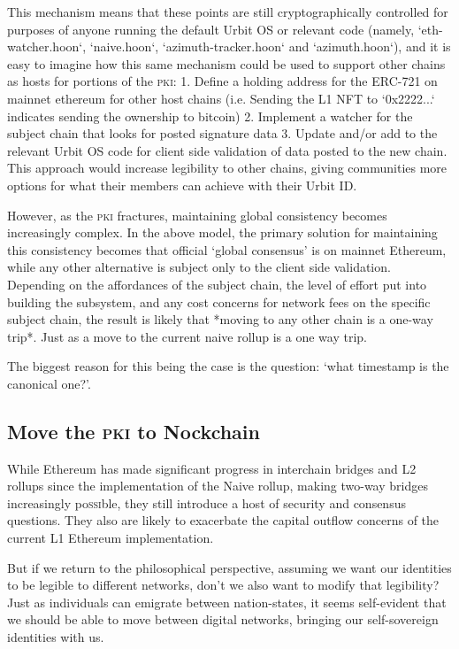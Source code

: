 \documentclass[twoside]{article}
\begin{document}
This mechanism means that these points are still cryptographically controlled for purposes of anyone running the default Urbit OS or relevant code (namely, `eth-watcher.hoon`, `naive.hoon`, `azimuth-tracker.hoon` and `azimuth.hoon`), and it is easy to imagine how this same mechanism could be used to support other chains as hosts for portions of the \textsc{pki}:
1. Define a holding address for the ERC-721 on mainnet ethereum for other host chains (i.e. Sending the L1 NFT to `0x2222...` indicates sending the ownership to bitcoin)
2. Implement a watcher for the subject chain that looks for posted signature data
3. Update and/or add to the relevant Urbit OS code for client side validation of data posted to the new chain.
This approach would increase legibility to other chains, giving communities more options for what their members can achieve with their Urbit ID. 

However, as the \textsc{pki} fractures, maintaining global consistency becomes increasingly complex. In the above model, the primary solution for maintaining this consistency becomes that official `global consensus' is on mainnet Ethereum, while any other alternative is subject only to the client side validation. Depending on the affordances of the subject chain, the level of effort put into building the subsystem, and any cost concerns for network fees on the specific subject chain, the result is likely that *moving to any other chain is a one-way trip*. Just as a move to the current naive rollup is a one way trip.

The biggest reason for this being the case is the question: `what timestamp is the canonical one?'. 

\subsection{Move the \textsc{pki} to Nockchain}

While Ethereum has made significant progress in interchain bridges and L2 rollups since the implementation of the Naive rollup, making two-way bridges increasingly po\textsc{ssi}ble, they still introduce a host of security and consensus questions. They also are likely to exacerbate the capital outflow concerns of the current L1 Ethereum implementation.

But if we return to the philosophical perspective, assuming we want our identities to be legible to different networks, don't we also want to modify that legibility? Just as individuals can emigrate between nation-states, it seems self-evident that we should be able to move between digital networks, bringing our self-sovereign identities with us.
\end{document}
